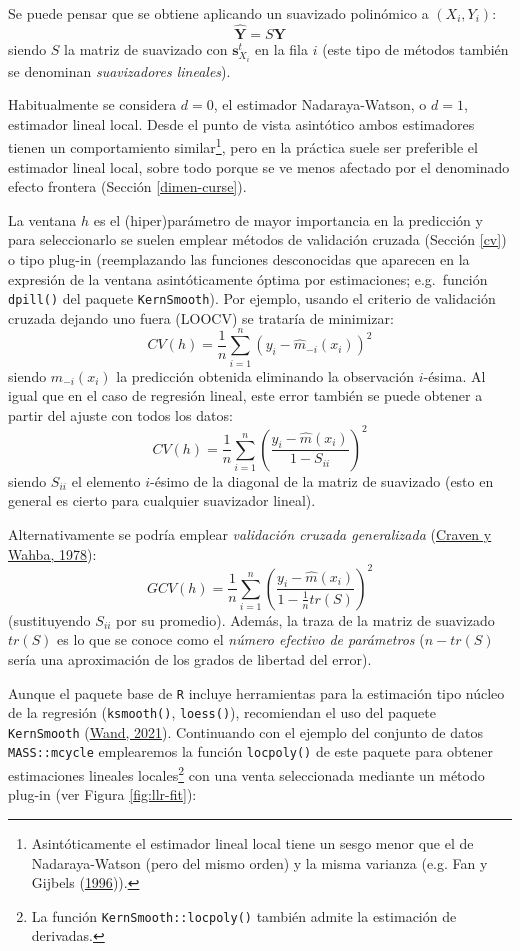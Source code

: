 \documentclass[
]{book}
\theoremstyle{break}
\theoremstyle{nonumberplain}
\begin{document}
Se puede pensar que se obtiene aplicando un suavizado polinómico a
\((X_i, Y_i)\):
\[\hat{\mathbf{Y}} = S\mathbf{Y}\]
siendo \(S\) la matriz de suavizado con \(\mathbf{s}_{X_{i}}^{t}\) en la fila \(i\) (este tipo de métodos también se denominan \emph{suavizadores lineales}).

Habitualmente se considera \(d=0\), el estimador Nadaraya-Watson, o \(d=1\), estimador lineal local.
Desde el punto de vista asintótico ambos estimadores tienen un comportamiento similar\footnote{Asintóticamente el estimador lineal local tiene un sesgo menor que el de Nadaraya-Watson (pero del mismo orden) y la misma varianza (e.g. Fan y Gijbels (\protect\hyperlink{ref-fan1996}{1996})).}, pero en la práctica suele ser preferible el estimador lineal local, sobre todo porque se ve menos afectado por el denominado efecto frontera (Sección \ref{dimen-curse}).

La ventana \(h\) es el (hiper)parámetro de mayor importancia en la predicción y para seleccionarlo se suelen emplear métodos de validación cruzada (Sección \ref{cv}) o tipo plug-in (reemplazando las funciones desconocidas que aparecen en la expresión de la ventana asintóticamente óptima por estimaciones; e.g.~función \texttt{dpill()} del paquete \texttt{KernSmooth}).
Por ejemplo, usando el criterio de validación cruzada dejando uno fuera (LOOCV) se trataría de minimizar:
\[CV(h)=\frac{1}{n}\sum_{i=1}^n(y_i-\hat{m}_{-i}(x_i))^2\]
siendo \(\hat{m}_{-i}(x_i)\) la predicción obtenida eliminando la observación \(i\)-ésima.
Al igual que en el caso de regresión lineal, este error también se puede obtener a partir del ajuste con todos los datos:
\[CV(h)=\frac{1}{n}\sum_{i=1}^n\left(\frac{y_i-\hat{m}(x_i)}{1 - S_{ii}}\right)^2\]
siendo \(S_{ii}\) el elemento \(i\)-ésimo de la diagonal de la matriz de suavizado (esto en general es cierto para cualquier suavizador lineal).

Alternativamente se podría emplear \emph{validación cruzada generalizada} (\protect\hyperlink{ref-craven1978smoothing}{Craven y Wahba, 1978}):
\[GCV(h)=\frac{1}{n}\sum_{i=1}^n\left(\frac{y_i-\hat{m}(x_i)}{1 - \frac{1}{n}tr(S)}\right)^2\]
(sustituyendo \(S_{ii}\) por su promedio).
Además, la traza de la matriz de suavizado \(tr(S)\) es lo que se conoce como el \emph{número efectivo de parámetros} (\(n - tr(S)\) sería una aproximación de los grados de libertad del error).

Aunque el paquete base de \texttt{R} incluye herramientas para la estimación tipo núcleo de la regresión (\texttt{ksmooth()}, \texttt{loess()}), recomiendan el uso del paquete \texttt{KernSmooth} (\protect\hyperlink{ref-R-KernSmooth}{Wand, 2021}).
Continuando con el ejemplo del conjunto de datos \texttt{MASS::mcycle} emplearemos la función \texttt{locpoly()} de este paquete para obtener estimaciones lineales locales\footnote{La función \texttt{KernSmooth::locpoly()} también admite la estimación de derivadas.} con una venta seleccionada mediante un método plug-in (ver Figura \ref{fig:llr-fit}):
\end{document}
